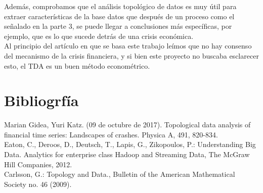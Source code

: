 \documentclass{article}
\begin{document}
Además, comprobamos que el análisis topológico de datos es muy útil para extraer características de la base datos que después de un proceso como el señalado en la parte 3, se puede llegar a conclusiones más específicas, por ejemplo, que es lo que sucede detrás de una crisis económica.\\

Al principio del artículo en que se basa este trabajo leímos que no hay consenso del mecanismo de la crisis financiera, y si bien este proyecto no buscaba esclarecer esto, el TDA es un buen método econométrico. 

\maketitle

\section{Bibliogrfía}

Marian Gidea, Yuri Katz. (09 de octubre de 2017). Topological data analysis of financial time series: Landscapes of crashes. Physica A, 491, 820-834.\\

Eaton, C., Deroos, D., Deutsch, T., Lapis, G., Zikopoulos, P.: Understanding Big Data. Analytics for enterprise class Hadoop and Streaming Data, The McGraw Hill Companies, 2012.\\

Carlsson, G.: Topology and Data., Bulletin of the American Mathematical Society no. 46 (2009).\\
\end{document}
